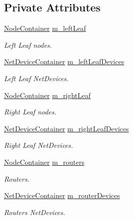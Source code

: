 \subsection*{Private Attributes}
\begin{DoxyCompactItemize}
\item 
\hyperlink{classns3_1_1NodeContainer}{Node\+Container} \hyperlink{classns3_1_1PointToPointDumbbellHelper_adc3b5ba830d66a3afe4009138b567db0}{m\+\_\+left\+Leaf}
\begin{DoxyCompactList}\small\item\em Left Leaf nodes. \end{DoxyCompactList}\item 
\hyperlink{classns3_1_1NetDeviceContainer}{Net\+Device\+Container} \hyperlink{classns3_1_1PointToPointDumbbellHelper_aa654e18b9487a3a3bf8ac96babc0caa2}{m\+\_\+left\+Leaf\+Devices}
\begin{DoxyCompactList}\small\item\em Left Leaf Net\+Devices. \end{DoxyCompactList}\item 
\hyperlink{classns3_1_1NodeContainer}{Node\+Container} \hyperlink{classns3_1_1PointToPointDumbbellHelper_a68bce973bff75333cd89917b5350a9dd}{m\+\_\+right\+Leaf}
\begin{DoxyCompactList}\small\item\em Right Leaf nodes. \end{DoxyCompactList}\item 
\hyperlink{classns3_1_1NetDeviceContainer}{Net\+Device\+Container} \hyperlink{classns3_1_1PointToPointDumbbellHelper_adc4c3f2b09e68ee52f4c54def7ff2f9a}{m\+\_\+right\+Leaf\+Devices}
\begin{DoxyCompactList}\small\item\em Right Leaf Net\+Devices. \end{DoxyCompactList}\item 
\hyperlink{classns3_1_1NodeContainer}{Node\+Container} \hyperlink{classns3_1_1PointToPointDumbbellHelper_a6fcec768335fc9e33779a551c1141bc4}{m\+\_\+routers}
\begin{DoxyCompactList}\small\item\em Routers. \end{DoxyCompactList}\item 
\hyperlink{classns3_1_1NetDeviceContainer}{Net\+Device\+Container} \hyperlink{classns3_1_1PointToPointDumbbellHelper_a5e58f325f9814c03c7cb3764aa130233}{m\+\_\+router\+Devices}
\begin{DoxyCompactList}\small\item\em Routers Net\+Devices. \end{DoxyCompactList}\item 

\end{DoxyCompactItemize}
